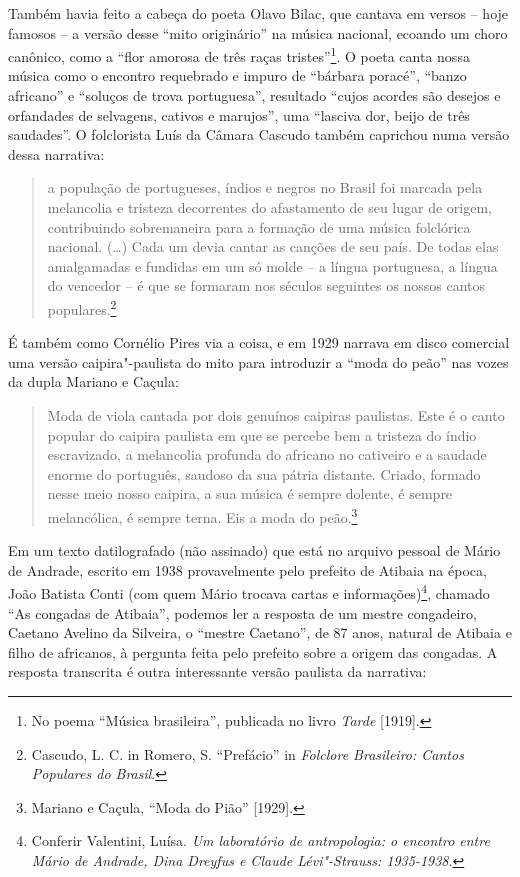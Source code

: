 Também havia feito a cabeça do poeta Olavo Bilac, que cantava em versos
-- hoje famosos -- a versão desse ``mito originário'' na música
nacional, ecoando um choro canônico, como a ``flor amorosa de três raças
tristes''\footnote{No poema ``Música brasileira'', publicada no livro
  \emph{Tarde} {[}1919{]}.}. O poeta canta nossa música como o encontro
requebrado e impuro de ``bárbara poracé'', ``banzo africano'' e
``soluços de trova portuguesa'', resultado ``cujos acordes são desejos e
orfandades de selvagens, cativos e marujos'', uma ``lasciva dor, beijo
de três saudades''. O folclorista Luís da Câmara Cascudo também
caprichou numa versão dessa narrativa:

\begin{quote}
a população de portugueses, índios e negros no Brasil foi marcada pela
melancolia e tristeza decorrentes do afastamento de seu lugar de origem,
contribuindo sobremaneira para a formação de uma música folclórica
nacional. (\ldots{}) Cada um devia cantar as canções de seu país. De todas
elas amalgamadas e fundidas em um só molde -- a língua portuguesa, a
língua do vencedor -- é que se formaram nos séculos seguintes os nossos
cantos populares.\footnote{Cascudo, L. C. in Romero, S. ``Prefácio'' in
  \emph{Folclore Brasileiro: Cantos Populares do Brasil}.}
\end{quote}

É também como Cornélio Pires via a coisa, e em 1929 narrava em disco
comercial uma versão caipira"-paulista do mito para introduzir a ``moda
do peão'' nas vozes da dupla Mariano e Caçula:

\begin{quote}
Moda de viola cantada por dois genuínos caipiras paulistas. Este é o
canto popular do caipira paulista em que se percebe bem a tristeza do
índio escravizado, a melancolia profunda do africano no cativeiro e a
saudade enorme do português, saudoso da sua pátria distante. Criado,
formado nesse meio nosso caipira, a sua música é sempre dolente, é
sempre melancólica, é sempre terna. Eis a moda do peão.\footnote{Mariano
  e Caçula, ``Moda do Pião'' {[}1929{]}.}
\end{quote}

Em um texto datilografado (não assinado) que está no arquivo pessoal de
Mário de Andrade, escrito em 1938 provavelmente pelo prefeito de Atibaia
na época, João Batista Conti (com quem Mário trocava cartas e
informações)\footnote{Conferir Valentini, Luísa. \emph{Um laboratório de
  antropologia: o encontro entre Mário de Andrade, Dina Dreyfus e Claude
  Lévi"-Strauss: 1935-1938}.}, chamado ``As congadas de Atibaia'',
podemos ler a resposta de um mestre congadeiro, Caetano Avelino da
Silveira, o ``mestre Caetano'', de 87 anos, natural de Atibaia e filho
de africanos, à pergunta feita pelo prefeito sobre a origem das
congadas. A resposta transcrita é outra interessante versão paulista da
narrativa:

